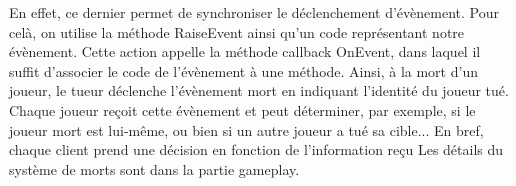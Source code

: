             En effet, ce dernier permet de synchroniser le déclenchement d'évènement. Pour celà, on utilise la méthode RaiseEvent ainsi
            qu'un code représentant notre évènement. Cette action appelle la méthode callback OnEvent, dans laquel il suffit d'associer le
            code de l'évènement à une méthode. Ainsi, à la mort d'un joueur, le tueur déclenche l'évènement mort en indiquant l'identité du
            joueur tué. Chaque joueur reçoit cette évènement et peut déterminer, par exemple, si le joueur mort est lui-même, ou bien si un
            autre joueur a tué sa cible... En bref, chaque client prend une décision en fonction de l'information reçu
            Les détails du système de morts sont dans la partie gameplay.
